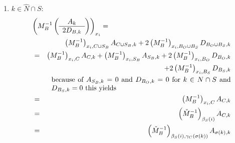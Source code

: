 \documentclass[a4paper]{article}
\begin{document}
\begin{enumerate}
\item $k \in \hat{N} \cap S$:
\begin{eqnarray}
\label{eq:r1_i_B_S_k_N_S}
\lefteqn{\left(M_{B}^{-1}
           \left(\begin{array}{c}
                   A_{k} \\
	           \hline
	           2D_{B, k}
	         \end{array}
           \right)
         \right)_{x_{i}}
=} \nonumber \\
&&
\left(M_{B}^{-1}\right)_{x_{i}, C \cup S_{B}}A_{C \cup S_{B}, k}
+2\left(M_{B}^{-1}\right)_{x_{i}, B_{O} \cup B_{S}}D_{B_{O} \cup B_{S}, k}
\nonumber \\
&=&
\left(M_{B}^{-1}\right)_{x_{i}, C}A_{C, k}
+\left(M_{B}^{-1}\right)_{x_{i}, S_{B}}A_{S_{B}, k}
+2\left(M_{B}^{-1}\right)_{x_{i}, B_{O}}D_{B_{O}, k}
\nonumber \\
&&
+2\left(M_{B}^{-1}\right)_{x_{i}, B_{S}}D_{B_{S}, k}
\nonumber \\
&&\begin{minipage}{9cm}
because of $A_{S_{B},k}=0$ and $D_{B_{O}, k}=0$ for
$k \in N \cap S$ and $D_{B_{S}, k}=0$ this yields
\end{minipage}
\nonumber \\
&=&
\left(M_{B}^{-1}\right)_{x_{i}, C}A_{C, k}
\nonumber \\
&=&
\left(\check{M}_{B}^{-1}\right)_{\beta_{S}(i)}A_{C, k}
\nonumber \\
&=&
\left(\check{M}_{B}^{-1}\right)_{\beta_{S}(i), \gamma_{C}(\sigma(k))}
  A_{\sigma(k), k}
\end{eqnarray}


\end{enumerate}
\end{document}
